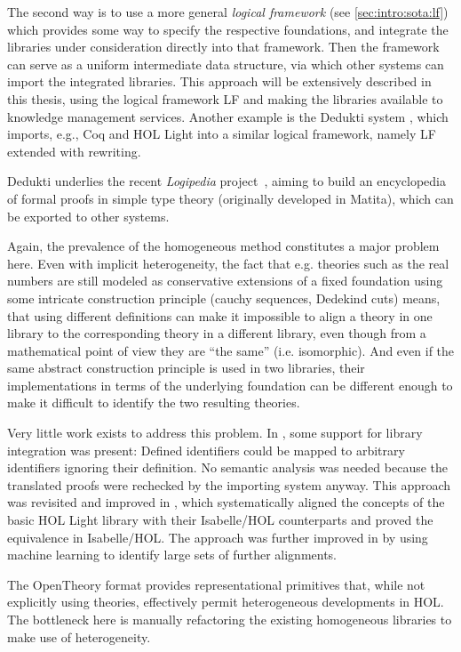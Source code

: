 The second way is to use a more general \emph{logical framework} (see \autoref{sec:intro:sota:lf}) which provides some way to specify the respective foundations, and integrate the libraries under consideration directly into that framework. Then the framework can serve as a uniform intermediate data
structure, via which other systems can import the integrated libraries. This approach will be extensively described in this thesis, using the
logical framework LF \cite{lf} and making the libraries available to knowledge management
services.  Another example is the Dedukti system \cite{dedukti}, which imports,
e.g., Coq and HOL Light into a similar logical framework, namely LF extended with
rewriting.

Dedukti underlies the recent \emph{Logipedia} project~\cite{logipedia}, aiming to build an encyclopedia of formal proofs in simple type theory (originally developed in Matita), which can be exported to other systems.

Again, the prevalence of the homogeneous method constitutes a major problem here. Even with implicit heterogeneity, the fact that e.g. theories such as the real numbers are still modeled as conservative extensions of a fixed foundation using some intricate construction principle (cauchy sequences, Dedekind cuts) means, that using different definitions can make it impossible to align a theory in one library to the corresponding theory in a different library, even though from a mathematical point of view they are ``the same'' (i.e. isomorphic). And even if the same abstract construction principle is used in two libraries, their implementations in terms of the underlying foundation can be different enough to make it difficult to identify the two resulting theories. \medskip

Very little work exists to address this problem.  In \cite{hol_isahol}, some support for
library integration was present: Defined identifiers could be mapped to arbitrary
identifiers ignoring their definition.  No semantic analysis was needed because the
translated proofs were rechecked by the importing system anyway.  This approach was
revisited and improved in \cite{hol_isahol_kaliszyk}, which systematically aligned
the concepts of the basic HOL Light library with their Isabelle/HOL counterparts and
proved the equivalence in Isabelle/HOL.  The approach was further improved in
\cite{hol_isahol_matching} by using machine learning to identify large sets of further
alignments.

The OpenTheory format \cite{opentheory} provides representational primitives that,
while not explicitly using theo\-ries, effectively permit heterogeneous developments in HOL.
The bottleneck here is manually re\-fac\-tor\-ing the existing homogeneous libraries to make use
of heterogeneity.


